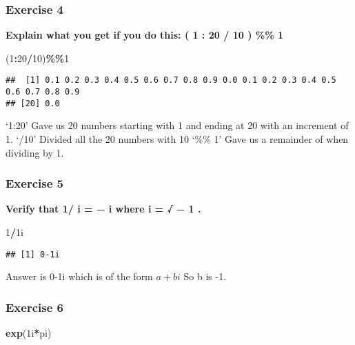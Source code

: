 \documentclass[
]{article}
\newenvironment{Shaded}{\begin{snugshade}}{\end{snugshade}}
\newcommand{\DecValTok}[1]{\textcolor[rgb]{0.00,0.00,0.81}{#1}}
\newcommand{\KeywordTok}[1]{\textcolor[rgb]{0.13,0.29,0.53}{\textbf{#1}}}
\newcommand{\NormalTok}[1]{#1}
\newcommand{\OperatorTok}[1]{\textcolor[rgb]{0.81,0.36,0.00}{\textbf{#1}}}
\begin{document}
\hypertarget{exercise-4}{%
\subsubsection{Exercise 4}\label{exercise-4}}

\textbf{Explain what you get if you do this: ( 1 : 20 / 10 ) \%\% 1}

\begin{Shaded}
\begin{Highlighting}[]
\NormalTok{(}\DecValTok{1}\OperatorTok{:}\DecValTok{20}\OperatorTok{/}\DecValTok{10}\NormalTok{)}\OperatorTok{\%\%}\DecValTok{1}
\end{Highlighting}
\end{Shaded}

\begin{verbatim}
##  [1] 0.1 0.2 0.3 0.4 0.5 0.6 0.7 0.8 0.9 0.0 0.1 0.2 0.3 0.4 0.5 0.6 0.7 0.8 0.9
## [20] 0.0
\end{verbatim}

`1:20' Gave us 20 numbers starting with 1 and ending at 20 with an
increment of 1. `/10' Divided all the 20 numbers with 10 `\%\% 1' Gave
us a remainder of when dividing by 1.

\hypertarget{exercise-5}{%
\subsubsection{Exercise 5}\label{exercise-5}}

\textbf{Verify that 1/ i = − i where i = √ − 1 .}

\begin{Shaded}
\begin{Highlighting}[]
\DecValTok{1}\OperatorTok{/}\NormalTok{1i}
\end{Highlighting}
\end{Shaded}

\begin{verbatim}
## [1] 0-1i
\end{verbatim}

Answer is 0-1i which is of the form \(a + bi\) So b is -1.

\hypertarget{exercise-6}{%
\subsubsection{Exercise 6}\label{exercise-6}}

\begin{Shaded}
\begin{Highlighting}[]
\KeywordTok{exp}\NormalTok{(1i}\OperatorTok{*}\NormalTok{pi)}
\end{Highlighting}
\end{Shaded}
\end{document}
